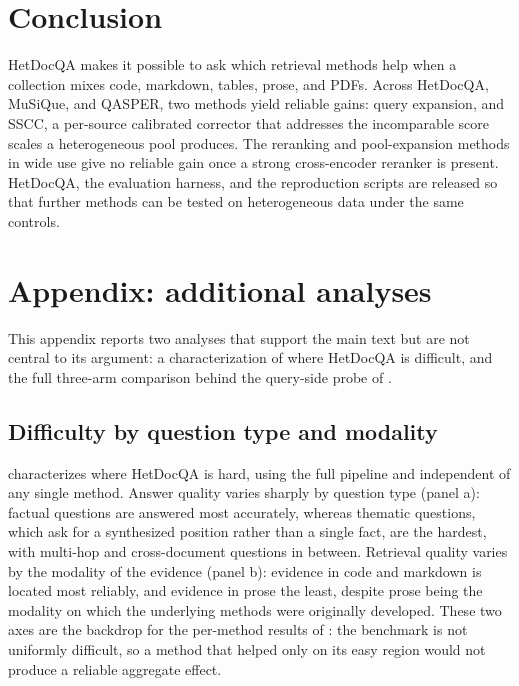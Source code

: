 \documentclass[10pt,twocolumn]{article}
\begin{document}
\section{Conclusion}
HetDocQA makes it possible to ask which retrieval methods help when a
collection mixes code, markdown, tables, prose, and PDFs. Across HetDocQA, MuSiQue, and
QASPER, two methods yield reliable gains: query
expansion, and SSCC, a per-source calibrated corrector that addresses the
incomparable score scales a heterogeneous pool produces. The reranking and
pool-expansion methods in wide use give no reliable gain once a strong
cross-encoder reranker is present. HetDocQA, the evaluation harness, and the
reproduction scripts are released so that further methods can be tested on
heterogeneous data under the same controls.




\appendix
\onecolumn
\section{Appendix: additional analyses}

This appendix reports two analyses that support the main text but are not central
to its argument: a characterization of where HetDocQA is difficult, and the
full three-arm comparison behind the query-side probe of .

\subsection{Difficulty by question type and modality}
 characterizes where HetDocQA is hard, using the full
pipeline and independent of any single method. Answer quality varies sharply by
question type (panel a): factual questions are answered most accurately, whereas
thematic questions, which ask for a synthesized position rather than a single
fact, are the hardest, with multi-hop and cross-document questions in between.
Retrieval quality varies by the modality of the evidence (panel b): evidence in
code and markdown is located most reliably, and evidence in prose the least,
despite prose being the modality on which the underlying methods were originally
developed. These two axes are the backdrop for the per-method results of
: the benchmark is not uniformly difficult, so a method that
helped only on its easy region would not produce a reliable aggregate effect.
\end{document}
